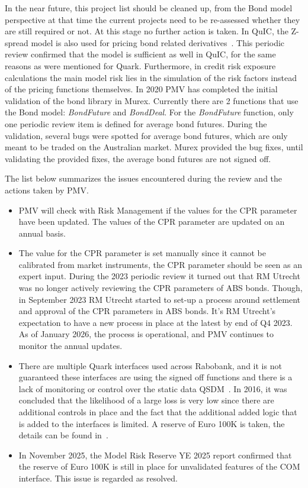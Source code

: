 \documentclass[reviewdoc]{pmv_report}  %
\begin{document}
{In the near future, this project list should be cleaned up, from the Bond model perspective at that time the current projects need to be re-assessed whether they are still required or not.
At this stage no further action is taken.
\newline\newline
In QuIC, the Z-spread model is also used for pricing bond related derivatives~\cite{Quic.IRBondFutures}.
This periodic review confirmed that the model is sufficient as well in QuIC, for the same reasons as were mentioned for Quark.
Furthermore, in credit risk exposure calculations the main model risk lies in the simulation of the risk factors instead of the pricing functions themselves.
\newline\newline
In 2020 PMV has completed the initial validation of the bond library in Murex.
Currently there are 2 functions that use the Bond model: \textit{BondFuture} and \textit{BondDeal}.
For the \textit{BondFuture} function,  only one periodic review item is defined for average bond futures.
During the validation, several bugs were spotted for average bond futures, which are only meant to be traded on the Australian market.
Murex provided the bug fixes, until validating the provided fixes, the average bond futures are not signed off.

The list below summarizes the issues encountered during the review and the actions taken by PMV.
\begin{itemize}
\item[\textbf{Issue 1}] PMV will check with Risk Management if the values for the CPR parameter have been updated.
The values of the CPR parameter are updated on an annual basis.
\item[\textbf{Action 1}] The value for the CPR parameter is set manually since it cannot be calibrated from market instruments, the CPR parameter should be seen as an expert input.
    During the 2023 periodic review it turned out that RM Utrecht was no longer actively reviewing the CPR parameters of ABS bonds.
    Though, in September 2023 RM Utrecht started to set-up a process around settlement and approval of the CPR parameters in ABS bonds.
    It's RM Utrecht's expectation to have a new process in place at the latest by end of Q4 2023.
    As of January 2026, the process is operational, and PMV continues to monitor the annual updates.
\item[\textbf{Issue 2}] There are multiple Quark interfaces used across Rabobank, and it is not guaranteed these interfaces are using the signed off functions and there is a lack of monitoring or control over the static data QSDM~\cite{MemoMultiInterfaceQuark}.
In 2016, it was concluded that the likelihood of a large loss is very low since there are additional controls in place and the fact that the additional added logic that is added to the interfaces is limited.
A reserve of Euro 100K is taken, the details can be found in~\cite{ModelRiskReserve20160630}.
\item[\textbf{Action 2}] In November 2025, the Model Risk Reserve YE 2025 report confirmed that the reserve of Euro 100K is still in place for unvalidated features of the COM interface.
This issue is regarded as resolved.
\end{itemize}
}
\end{document}
